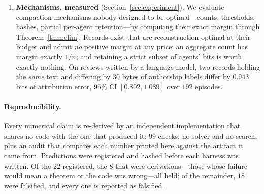 \begin{enumerate}
      ``how many agents succeeded'' is far inside the tension regime.
\item \textbf{Mechanisms, measured} (Section~\ref{sec:experiment}). We evaluate
      compaction mechanisms nobody designed to be optimal---counts, thresholds,
      hashes, partial per-agent retention---by computing their exact margin
      through Theorem~\ref{thm:elim}. Records exist that are
      reconstruction-optimal at their budget and admit \emph{no} positive margin
      at any price; an aggregate count has margin exactly $1/n$; and retaining a
      strict subset of agents' bits is worth exactly nothing. On reviews
      written by a language model, two records holding the \emph{same} text
      and differing by $30$ bytes of authorship labels differ by $0.943$ bits
      of attribution error, $95\%$ CI $[0.802, 1.089]$ over $192$ episodes.
\end{enumerate}

\paragraph{Reproducibility.}
Every numerical claim is re-derived by an independent implementation that shares
no code with the one that produced it: $99$ checks, no solver and no search,
plus an audit that compares each number printed here against the artifact it came
from. Predictions were registered and hashed before each harness was written. Of
the $22$ registered, the $8$ that were derivations---those whose failure would
mean a theorem or the code was wrong---all held; of the remainder, $18$ were
falsified, and every one is reported as falsified.

